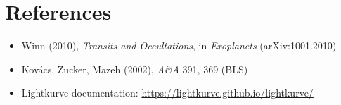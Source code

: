 \section*{References}
\begin{itemize}
\item Winn (2010), \textit{Transits and Occultations}, in \textit{Exoplanets} (arXiv:1001.2010)
\item Kov\'acs, Zucker, Mazeh (2002), \textit{A\&A} 391, 369 (BLS)
\item Lightkurve documentation: \url{https://lightkurve.github.io/lightkurve/}
\end{itemize}

